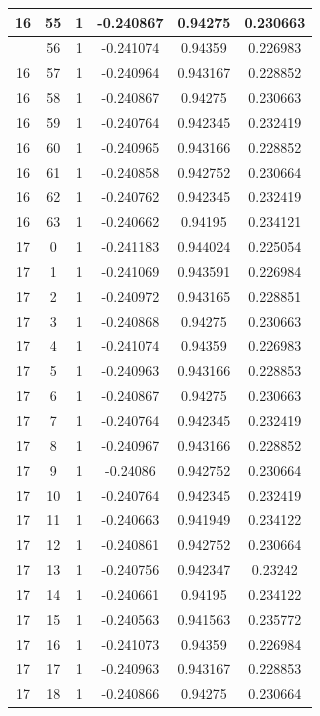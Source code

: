 \documentclass[12pt,a4paper]{article}
\numberwithin{equation}{section}
\numberwithin{figure}{section}
\numberwithin{table}{section}
\begin{document}
\begin{longtable}{|c|c|c|c|c|c|}
16 & 55 & 1 & -0.240867 & 0.94275 & 0.230663 \\ \hline
\pagebreak
16 & 56 & 1 & -0.241074 & 0.94359 & 0.226983 \\ \hline
16 & 57 & 1 & -0.240964 & 0.943167 & 0.228852 \\ \hline
16 & 58 & 1 & -0.240867 & 0.94275 & 0.230663 \\ \hline
16 & 59 & 1 & -0.240764 & 0.942345 & 0.232419 \\ \hline
16 & 60 & 1 & -0.240965 & 0.943166 & 0.228852 \\ \hline
16 & 61 & 1 & -0.240858 & 0.942752 & 0.230664 \\ \hline
16 & 62 & 1 & -0.240762 & 0.942345 & 0.232419 \\ \hline
16 & 63 & 1 & -0.240662 & 0.94195 & 0.234121 \\ \hline
17 & 0 & 1 & -0.241183 & 0.944024 & 0.225054 \\ \hline
17 & 1 & 1 & -0.241069 & 0.943591 & 0.226984 \\ \hline
17 & 2 & 1 & -0.240972 & 0.943165 & 0.228851 \\ \hline
17 & 3 & 1 & -0.240868 & 0.94275 & 0.230663 \\ \hline
17 & 4 & 1 & -0.241074 & 0.94359 & 0.226983 \\ \hline
17 & 5 & 1 & -0.240963 & 0.943166 & 0.228853 \\ \hline
17 & 6 & 1 & -0.240867 & 0.94275 & 0.230663 \\ \hline
17 & 7 & 1 & -0.240764 & 0.942345 & 0.232419 \\ \hline
17 & 8 & 1 & -0.240967 & 0.943166 & 0.228852 \\ \hline
17 & 9 & 1 & -0.24086 & 0.942752 & 0.230664 \\ \hline
17 & 10 & 1 & -0.240764 & 0.942345 & 0.232419 \\ \hline
17 & 11 & 1 & -0.240663 & 0.941949 & 0.234122 \\ \hline
17 & 12 & 1 & -0.240861 & 0.942752 & 0.230664 \\ \hline
17 & 13 & 1 & -0.240756 & 0.942347 & 0.23242 \\ \hline
17 & 14 & 1 & -0.240661 & 0.94195 & 0.234122 \\ \hline
17 & 15 & 1 & -0.240563 & 0.941563 & 0.235772 \\ \hline
17 & 16 & 1 & -0.241073 & 0.94359 & 0.226984 \\ \hline
17 & 17 & 1 & -0.240963 & 0.943167 & 0.228853 \\ \hline
17 & 18 & 1 & -0.240866 & 0.94275 & 0.230664 \\ \hline

\end{longtable}
\end{document}
